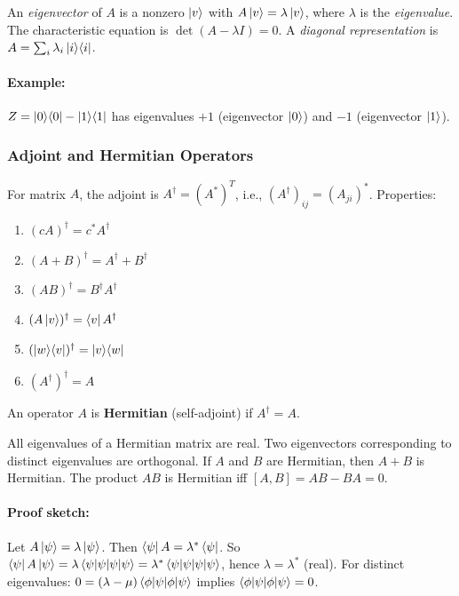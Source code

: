 \documentclass[10pt,a4paper]{article}
\begin{document}
An \emph{eigenvector} of $A$ is a nonzero $\ket{v}$ with $A\ket{v}=\lambda\ket{v}$, where $\lambda$ is the \emph{eigenvalue}. The characteristic equation is $\det(A-\lambda I)=0$. A \emph{diagonal representation} is $A=\sum_i\lambda_i\ket{i}\!\bra{i}$.

\paragraph{Example:} $Z=\ket{0}\!\bra{0}-\ket{1}\!\bra{1}$ has eigenvalues $+1$ (eigenvector $\ket{0}$) and $-1$ (eigenvector $\ket{1}$).

\subsubsection*{Adjoint and Hermitian Operators}

\begin{tcolorbox}[defstyle, title={Definition: Adjoint (Hermitian Conjugate)}]
For matrix $A$, the adjoint is $A^\dagger=(A^*)^T$, i.e., $(A^\dagger)_{ij}=(A_{ji})^*$. Properties:
\begin{enumerate}[nosep]
\item $(cA)^\dagger=c^*A^\dagger$
\item $(A+B)^\dagger=A^\dagger+B^\dagger$
\item $(AB)^\dagger=B^\dagger A^\dagger$
\item $(A\ket{v})^\dagger=\bra{v}A^\dagger$
\item $(\ket{w}\!\bra{v})^\dagger=\ket{v}\!\bra{w}$
\item $(A^\dagger)^\dagger=A$
\end{enumerate}
\end{tcolorbox}

\begin{tcolorbox}[defstyle, title={Definition: Hermitian Operator}]
An operator $A$ is \textbf{Hermitian} (self-adjoint) if $A^\dagger=A$.
\end{tcolorbox}

\begin{tcolorbox}[propstyle, title={Theorem: Properties of Hermitian Operators}]
All eigenvalues of a Hermitian matrix are real. Two eigenvectors corresponding to distinct eigenvalues are orthogonal. If $A$ and $B$ are Hermitian, then $A+B$ is Hermitian. The product $AB$ is Hermitian iff $[A,B]=AB-BA=0$.
\end{tcolorbox}

\paragraph{Proof sketch:} Let $A\ket{\psi}=\lambda\ket{\psi}$. Then $\bra{\psi}A=\lambda^*\bra{\psi}$. So $\bra{\psi}A\ket{\psi}=\lambda\braket{\psi|\psi}=\lambda^*\braket{\psi|\psi}$, hence $\lambda=\lambda^*$ (real). For distinct eigenvalues: $0=(\lambda-\mu)\braket{\phi|\psi}$ implies $\braket{\phi|\psi}=0$.
\end{document}
